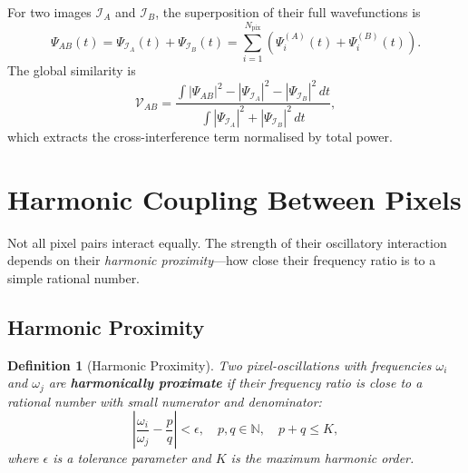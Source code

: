 \documentclass[11pt,twocolumn,a4paper]{article}
\newtheorem{definition}[theorem]{Definition}
\newcommand{\N}{\mathbb{N}}
\begin{document}
For two images $\mathcal{I}_A$ and $\mathcal{I}_B$, the superposition of their full wavefunctions is
\begin{equation}
    \Psi_{AB}(t) = \Psi_{\mathcal{I}_A}(t) + \Psi_{\mathcal{I}_B}(t) = \sum_{i=1}^{N_{\text{pix}}} \left(\Psi_i^{(A)}(t) + \Psi_i^{(B)}(t)\right).
    \label{eq:full_superposition}
\end{equation}
The global similarity is
\begin{equation}
    \mathcal{V}_{AB} = \frac{\int |\Psi_{AB}|^2 - |\Psi_{\mathcal{I}_A}|^2 - |\Psi_{\mathcal{I}_B}|^2 \, dt}{\int |\Psi_{\mathcal{I}_A}|^2 + |\Psi_{\mathcal{I}_B}|^2 \, dt},
    \label{eq:global_similarity}
\end{equation}
which extracts the cross-interference term normalised by total power.

\section{Harmonic Coupling Between Pixels}\label{sec:coupling}


Not all pixel pairs interact equally. The strength of their oscillatory interaction depends on their \emph{harmonic proximity}---how close their frequency ratio is to a simple rational number.

\subsection{Harmonic Proximity}

\begin{definition}[Harmonic Proximity]\label{def:harmonic_proximity}
Two pixel-oscillations with frequencies $\omega_i$ and $\omega_j$ are \textbf{harmonically proximate} if their frequency ratio is close to a rational number with small numerator and denominator:
\begin{equation}
    \left| \frac{\omega_i}{\omega_j} - \frac{p}{q} \right| < \epsilon, \quad p, q \in \N, \quad p + q \leq K,
    \label{eq:harmonic_proximity}
\end{equation}
where $\epsilon$ is a tolerance parameter and $K$ is the maximum harmonic order.
\end{definition}
\end{document}
